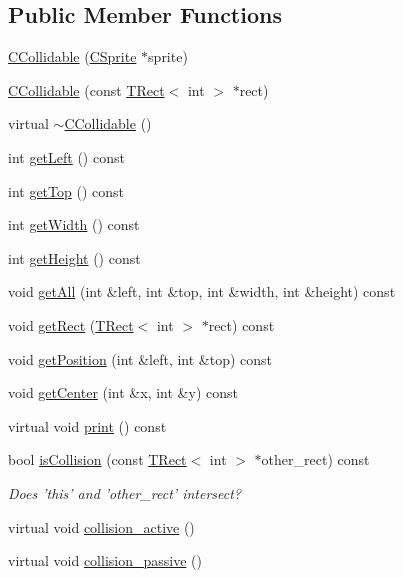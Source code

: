 \subsection*{Public Member Functions}
\begin{DoxyCompactItemize}
\item 
\hyperlink{classengine_1_1CCollidable_af462862c9147ddecb794456bac7d24af}{C\-Collidable} (\hyperlink{classCSprite}{C\-Sprite} $\ast$sprite)
\item 
\hyperlink{classengine_1_1CCollidable_a0cf5d0adac82ce344fa0a9944739d87b}{C\-Collidable} (const \hyperlink{classengine_1_1TRect}{T\-Rect}$<$ int $>$ $\ast$rect)
\item 
virtual \hyperlink{classengine_1_1CCollidable_aab6e393808cd5f3a6144889df36e9523}{$\sim$\-C\-Collidable} ()
\item 
int \hyperlink{classengine_1_1CCollidable_a4144d3b4711ae7570f6b122e5b4e1435}{get\-Left} () const 
\item 
int \hyperlink{classengine_1_1CCollidable_adb2d96cc98dc4b6ed5a26cd9129e1d2d}{get\-Top} () const 
\item 
int \hyperlink{classengine_1_1CCollidable_afba2923113db4ebde67912978885ec72}{get\-Width} () const 
\item 
int \hyperlink{classengine_1_1CCollidable_a6436c774e28bcbee83472f91c059283a}{get\-Height} () const 
\item 
void \hyperlink{classengine_1_1CCollidable_a0945e8a00846ff20ecdd86102afe04aa}{get\-All} (int \&left, int \&top, int \&width, int \&height) const 
\item 
void \hyperlink{classengine_1_1CCollidable_ae026a66abb2bfa169227255335d9f78b}{get\-Rect} (\hyperlink{classengine_1_1TRect}{T\-Rect}$<$ int $>$ $\ast$rect) const 
\item 
void \hyperlink{classengine_1_1CCollidable_a60fa629f81692094f135d01c2a4f5b69}{get\-Position} (int \&left, int \&top) const 
\item 
void \hyperlink{classengine_1_1CCollidable_a1855752c68f9d17856ce6c48234818fc}{get\-Center} (int \&x, int \&y) const 
\item 
virtual void \hyperlink{classengine_1_1CCollidable_a94c0157c8fdd9fccbfe8cdd726da2473}{print} () const 
\item 
bool \hyperlink{classengine_1_1CCollidable_afd5adee0a4b0a4f18ff2bdcda656c632}{is\-Collision} (const \hyperlink{classengine_1_1TRect}{T\-Rect}$<$ int $>$ $\ast$other\-\_\-rect) const 
\begin{DoxyCompactList}\small\item\em Does 'this' and 'other\-\_\-rect' intersect? \end{DoxyCompactList}\item 
virtual void \hyperlink{classengine_1_1CCollidable_abab887e8665ec79c153461eea5b7ea31}{collision\-\_\-active} ()
\item 
virtual void \hyperlink{classengine_1_1CCollidable_a610b5f5c85eeeee7e73d55a9c064353c}{collision\-\_\-passive} ()
\end{DoxyCompactItemize}

